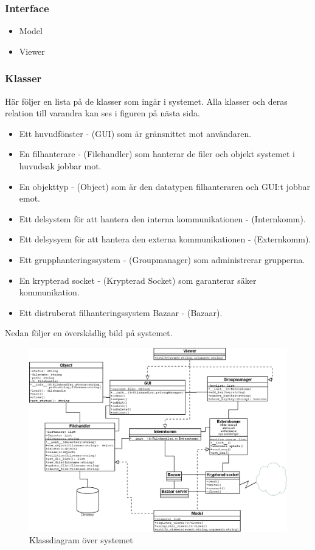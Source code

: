 \subsubsection{Interface}
\begin{itemize}
\item Model
\item Viewer
\end{itemize}
\subsubsection{Klasser}
Här följer en lista på de klasser som ingår i systemet. Alla klasser och deras relation till varandra kan ses i figuren på nästa sida.
\begin{itemize}
\item Ett huvudfönster - (GUI) som är gränsnittet mot användaren.
\item En filhanterare - (Filehandler) som hanterar de filer och objekt systemet i huvudsak jobbar mot.
\item En objekttyp - (Object) som är den datatypen filhanteraren och GUI:t jobbar emot.
\item Ett delsystem för att hantera den interna kommunikationen - (Internkomm).
\item Ett delsysyem för att hantera den externa kommunikationen - (Externkomm). 
\item Ett grupphanteringssystem - (Groupmanager) som administrerar grupperna.
\item En krypterad socket - (Krypterad Socket) som garanterar säker kommunikation.
\item Ett distruberat filhanteringssystem Bazaar - (Bazaar).
\end{itemize}
Nedan följer en överskådlig bild på systemet.
 
\begin{figure}[ht]
  \centering
  \includegraphics[width=160mm]{klassdiagram.png}
  \caption{Klassdiagram över systemet}
  \label{fig1}
\end{figure}
\clearpage
